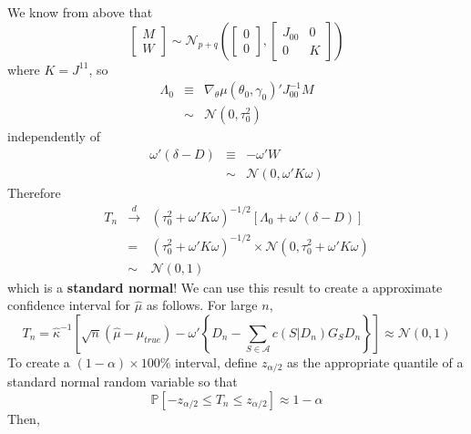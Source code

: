\documentclass[12pt]{article}
\theoremstyle{definition}
\newcommand{\p}{\mathbb{P}}
\begin{document}
We know from above that
	$$
	\left[\begin{array}{c}
		M\\
		W
	\end{array}\right] \sim \mathcal{N}_{p+q}\left(
	\left[\begin{array}{c}
		0\\
		0
	\end{array}\right],
	\left[\begin{array}{cc}
		J_{00}&0\\
		0&K
	\end{array}\right]\right)
$$
where $K = J^{11}$, so
	\begin{eqnarray*}
		\Lambda_0 &\equiv& \nabla_\theta \mu(\theta_0,\gamma_0)' J_{00}^{-1} M\\
			&\sim&  \mathcal{N}\left(0, \tau_0^2\right)
\end{eqnarray*}
independently of
	\begin{eqnarray*}
		\omega'\left( \delta - D\right)&\equiv&- \omega'W\\
			&\sim& \mathcal{N}\left(0, \omega'K\omega \right)
\end{eqnarray*}
Therefore
	\begin{eqnarray*}
		T_n &\overset{d}{\rightarrow}& (\tau_0^2 + \omega' K \omega)^{-1/2}\left[\Lambda_0 + \omega'\left( \delta - D\right)\right] \\
		&=& (\tau_0^2 + \omega' K \omega)^{-1/2} \times \mathcal{N}\left(0, \tau_0^2 + \omega'K\omega\right)\\
		&\sim& \mathcal{N}\left(0,1 \right)
\end{eqnarray*}
which is a \textbf{standard normal}! We can use this result to create a approximate confidence interval for $\hat{\mu}$ as follows. For large $n$, 
	$$T_n =\widehat{\kappa}^{-1}\left[\sqrt{n}(\hat{\mu} - \mu_{true})  - \omega'\left\{D_n -  \sum_{S\in \mathcal{A}} c(S|D_n)G_S D_n \right\} \right] \approx \mathcal{N}(0,1)$$
To create a $(1-\alpha)\times 100\%$ interval, define $z_{\alpha/2}$ as the appropriate quantile of a standard normal random variable so that
	$$\p \left[-z_{\alpha/2} \leq T_n \leq z_{\alpha/2} \right] \approx 1-\alpha $$
Then,
\end{document}
